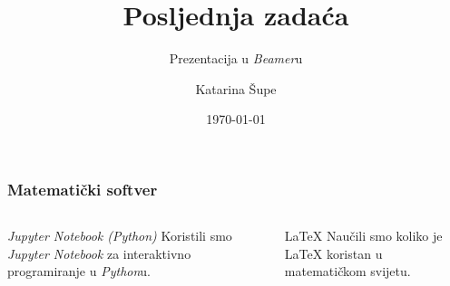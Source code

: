 \documentclass[xcolor=dvipsnames]{beamer}
\title{Posljednja zadaća}
\subtitle{Prezentacija u \emph{Beamer}u}
\author{\texorpdfstring{Katarina Šupe}{Katarina Supe}}
\institute[PMF--MO]{Prirodoslovno-matematički fakultet --- Matematički odsjek}
\date{\today}
\begin{document}
\begin{frame}[plain]
\titlepage
\end{frame}
\begin{frame}
\frametitle{Matematički softver}
\begin{columns}[t]
\begin{block}{\centering\emph{Jupyter Notebook (Python)}}
\centering
Koristili smo \emph{Jupyter Notebook} za interaktivno programiranje u \emph{Python}u.
\end{block}
\begin{block}{\centering\LaTeX}
\centering
Naučili smo koliko je \LaTeX{} koristan u matematičkom svijetu. 
\end{block}
\end{columns}
\end{frame}
\end{document}
